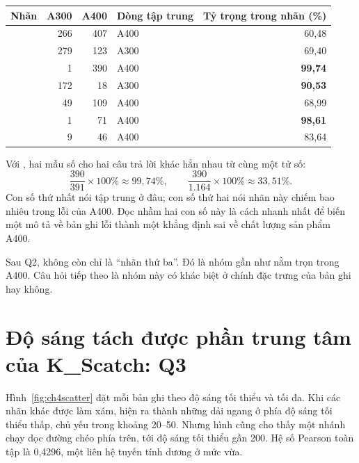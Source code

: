 \begin{center}\begin{minipage}{\linewidth}
\label{tab:ch4taptrung}
\small{}
\begin{tabularx}{\linewidth}{@{}Y rr p{2.0cm}r@{}}
\toprule
Nhãn & A300 & A400 & Dòng tập trung & Tỷ trọng trong nhãn (\%) \\
\midrule
{} & 266 & 407 & A400 & 60,48 \\
 & 279 & 123 & A300 & 69,40 \\
 & 1 & 390 & A400 & \textbf{99,74} \\
 & 172 & 18 & A300 & \textbf{90,53} \\
 & 49 & 109 & A400 & 68,99 \\
 & 1 & 71 & A400 & \textbf{98,61} \\
 & 9 & 46 & A400 & 83,64 \\
\bottomrule
\end{tabularx}
\end{minipage}\end{center}

Với , hai mẫu số cho hai câu trả lời khác hẳn nhau từ cùng một tử số:
\begin{equation}
\frac{390}{391}\times100\%\approx99{,}74\%,
\qquad
\frac{390}{1.164}\times100\%\approx33{,}51\%.
\label{eq:ch4mauso}
\end{equation}
Con số thứ nhất nói  tập trung ở đâu; con số thứ hai nói nhãn này chiếm bao nhiêu trong lỗi của A400. Đọc nhầm hai con số này là cách nhanh nhất để biến một mô tả về bản ghi lỗi thành một khẳng định sai về chất lượng sản phẩm A400.

Sau Q2,  không còn chỉ là ``nhãn thứ ba''. Đó là nhóm gần như nằm trọn trong A400. Câu hỏi tiếp theo là nhóm này có khác biệt ở chính đặc trưng của bản ghi hay không.

\section{Độ sáng tách được phần trung tâm của K\_Scatch: Q3}
\label{sec:ch4q3}

Hình~\ref{fig:ch4scatter} đặt mỗi bản ghi theo độ sáng tối thiểu và tối đa. Khi các nhãn khác được làm xám,  hiện ra thành những dải ngang ở phía độ sáng tối thiểu thấp, chủ yếu trong khoảng 20--50. Nhưng hình cũng cho thấy một nhánh  chạy dọc đường chéo phía trên, tới độ sáng tối thiểu gần 200. Hệ số Pearson toàn tập là 0,4296, một liên hệ tuyến tính dương ở mức vừa.

